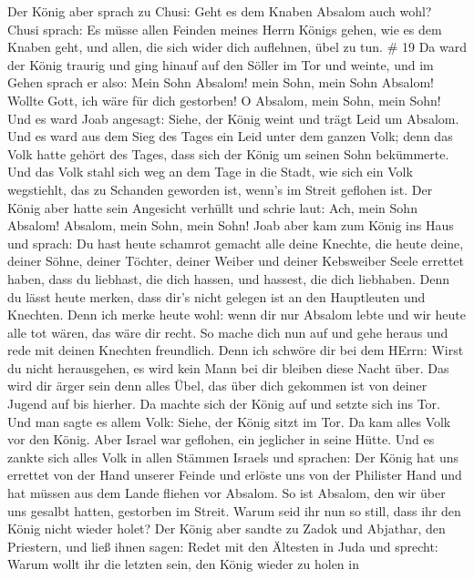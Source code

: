  Der König aber sprach zu Chusi: Geht es dem Knaben Absalom
auch wohl? Chusi sprach: Es müsse allen Feinden meines Herrn Königs
gehen, wie es dem Knaben geht, und allen, die sich wider dich auflehnen,
übel zu tun. \# 19  Da ward der König traurig und ging
hinauf auf den Söller im Tor und weinte, und im Gehen sprach er also:
Mein Sohn Absalom! mein Sohn, mein Sohn Absalom! Wollte Gott, ich wäre
für dich gestorben! O Absalom, mein Sohn, mein Sohn!  Und es
ward Joab angesagt: Siehe, der König weint und trägt Leid um Absalom.
 Und es ward aus dem Sieg des Tages ein Leid unter dem
ganzen Volk; denn das Volk hatte gehört des Tages, dass sich der König
um seinen Sohn bekümmerte.  Und das Volk stahl sich weg an
dem Tage in die Stadt, wie sich ein Volk wegstiehlt, das zu Schanden
geworden ist, wenn's im Streit geflohen ist.  Der König aber
hatte sein Angesicht verhüllt und schrie laut: Ach, mein Sohn Absalom!
Absalom, mein Sohn, mein Sohn!  Joab aber kam zum König ins
Haus und sprach: Du hast heute schamrot gemacht alle deine Knechte, die
heute deine, deiner Söhne, deiner Töchter, deiner Weiber und deiner
Kebsweiber Seele errettet haben,  dass du liebhast, die dich
hassen, und hassest, die dich liebhaben. Denn du lässt heute merken,
dass dir's nicht gelegen ist an den Hauptleuten und Knechten. Denn ich
merke heute wohl: wenn dir nur Absalom lebte und wir heute alle tot
wären, das wäre dir recht.  So mache dich nun auf und gehe
heraus und rede mit deinen Knechten freundlich. Denn ich schwöre dir bei
dem HErrn: Wirst du nicht herausgehen, es wird kein Mann bei dir bleiben
diese Nacht über. Das wird dir ärger sein denn alles Übel, das über dich
gekommen ist von deiner Jugend auf bis hierher.  Da machte
sich der König auf und setzte sich ins Tor. Und man sagte es allem Volk:
Siehe, der König sitzt im Tor. Da kam alles Volk vor den König. Aber
Israel war geflohen, ein jeglicher in seine Hütte.  Und es
zankte sich alles Volk in allen Stämmen Israels und sprachen: Der König
hat uns errettet von der Hand unserer Feinde und erlöste uns von der
Philister Hand und hat müssen aus dem Lande fliehen vor Absalom.
 So ist Absalom, den wir über uns gesalbt hatten, gestorben
im Streit. Warum seid ihr nun so still, dass ihr den König nicht wieder
holet?  Der König aber sandte zu Zadok und Abjathar, den
Priestern, und ließ ihnen sagen: Redet mit den Ältesten in Juda und
sprecht: Warum wollt ihr die letzten sein, den König wieder zu holen in
